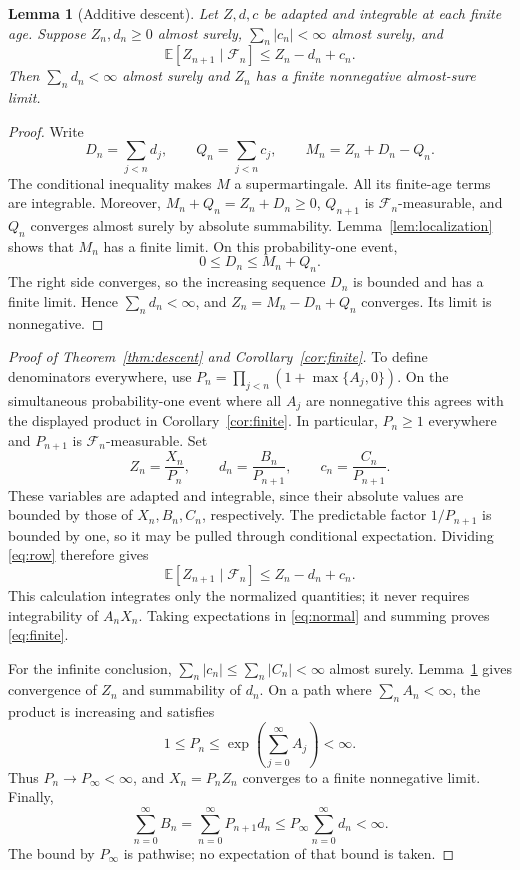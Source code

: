 \documentclass[11pt]{article}
\newtheorem{lemma}[theorem]{Lemma}
\newcommand{\E}{\mathbb E}
\newcommand{\F}{\mathcal F}
\begin{document}
\begin{lemma}[Additive descent]\label{lem:additive}
Let $Z,d,c$ be adapted and integrable at each finite age. Suppose
$Z_n,d_n\ge0$ almost surely, $\sum_n|c_n|<\infty$ almost surely, and
\[
 \E[Z_{n+1}\mid\F_n]\le Z_n-d_n+c_n.
\]
Then $\sum_n d_n<\infty$ almost surely and $Z_n$ has a finite nonnegative
almost-sure limit.
\end{lemma}
\begin{proof}
Write
\[
 D_n=\sum_{j<n}d_j,\qquad Q_n=\sum_{j<n}c_j,\qquad M_n=Z_n+D_n-Q_n.
\]
The conditional inequality makes $M$ a supermartingale. All its finite-age
terms are integrable. Moreover, $M_n+Q_n=Z_n+D_n\ge0$,
$Q_{n+1}$ is $\F_n$-measurable, and $Q_n$ converges almost surely by absolute
summability. Lemma~\ref{lem:localization} shows that $M_n$ has a finite limit.
On this probability-one event,
\[
 0\le D_n\le M_n+Q_n.
\]
The right side converges, so the increasing sequence $D_n$ is bounded and
has a finite limit. Hence $\sum_n d_n<\infty$, and
$Z_n=M_n-D_n+Q_n$ converges. Its limit is nonnegative.
\end{proof}

\begin{proof}[Proof of Theorem~\ref{thm:descent} and Corollary~\ref{cor:finite}]
To define denominators everywhere, use
$P_n=\prod_{j<n}(1+\max\{A_j,0\})$. On the simultaneous probability-one
event where all $A_j$ are nonnegative this agrees with the displayed product
in Corollary~\ref{cor:finite}. In particular, $P_n\ge1$ everywhere and
$P_{n+1}$ is $\F_n$-measurable. Set
\[
 Z_n=\frac{X_n}{P_n},\qquad
 d_n=\frac{B_n}{P_{n+1}},\qquad
 c_n=\frac{C_n}{P_{n+1}}.
\]
These variables are adapted and integrable, since their absolute values are
bounded by those of $X_n,B_n,C_n$, respectively. The predictable factor
$1/P_{n+1}$ is bounded by one, so it may be pulled through conditional
expectation. Dividing \eqref{eq:row} therefore gives
\begin{equation}\label{eq:normal}
 \E[Z_{n+1}\mid\F_n]\le Z_n-d_n+c_n.
\end{equation}
This calculation integrates only the normalized quantities; it never requires
integrability of $A_nX_n$. Taking expectations in \eqref{eq:normal} and
summing proves \eqref{eq:finite}.

For the infinite conclusion, $\sum_n|c_n|\le\sum_n|C_n|<\infty$ almost surely.
Lemma~\ref{lem:additive} gives convergence of $Z_n$ and summability of $d_n$.
On a path where $\sum_n A_n<\infty$, the product is increasing and satisfies
\[
 1\le P_n\le\exp\!\left(\sum_{j=0}^\infty A_j\right)<\infty.
\]
Thus $P_n\to P_\infty<\infty$, and $X_n=P_nZ_n$ converges to a finite
nonnegative limit. Finally,
\[
 \sum_{n=0}^\infty B_n
 =\sum_{n=0}^\infty P_{n+1}d_n
 \le P_\infty\sum_{n=0}^\infty d_n<\infty.
\]
The bound by $P_\infty$ is pathwise; no expectation of that bound is taken.
\end{proof}
\end{document}
